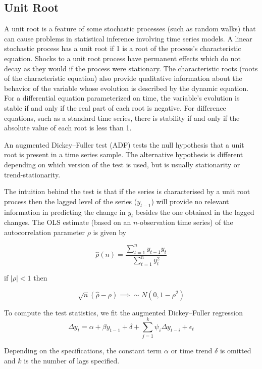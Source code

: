 \documentclass[
  11pt,
]{article}
\begin{document}
\hypertarget{unit-root}{%
\subsection{Unit Root}\label{unit-root}}

A unit root is a feature of some stochastic processes (such as random
walks) that can cause problems in statistical inference involving time
series models. A linear stochastic process has a unit root if 1 is a
root of the process's characteristic equation. Shocks to a unit root
process have permanent effects which do not decay as they would if the
process were stationary. The characteristic roots (roots of the
characteristic equation) also provide qualitative information about the
behavior of the variable whose evolution is described by the dynamic
equation. For a differential equation parameterized on time, the
variable's evolution is stable if and only if the real part of each root
is negative. For difference equations, such as a standard time series,
there is stability if and only if the absolute value of each root is
less than 1.

An augmented Dickey--Fuller test (ADF) tests the null hypothesis that a
unit root is present in a time series sample. The alternative hypothesis
is different depending on which version of the test is used, but is
usually stationarity or trend-stationarity.

The intuition behind the test is that if the series is characterised by
a unit root process then the lagged level of the series (\(y_{t-1}\))
will provide no relevant information in predicting the change in
\(y_{t}\) besides the one obtained in the lagged changes. The OLS
estimate (based on an \(n\)-observation time series) of the
autocorrelation parameter \(\rho\) is given by

\[
\hat{\rho}(n) = \frac{\sum\limits_{t=1}^{n}y_{t-1}y_{t}}{\sum\limits_{t=1}^{n}y_{t}^{2}}
\]

if \(\left|\rho \right| < 1\) then

\[
\sqrt{n}\left(\hat{\rho} - \rho\right) \implies \sim{N}(0, 1 - \rho^{2})
\]

To compute the test statistics, we fit the augmented Dickey--Fuller
regression \[
\Delta y_{t} = \alpha + \beta y_{t-1} + \delta + \sum\limits_{j=1}^{k}\psi_{i}\Delta y_{t- i} + \epsilon_{t}
\]

Depending on the specifications, the constant term \(\alpha\) or time
trend \(\delta\) is omitted and \(k\) is the number of lags specified.

  
\end{document}
